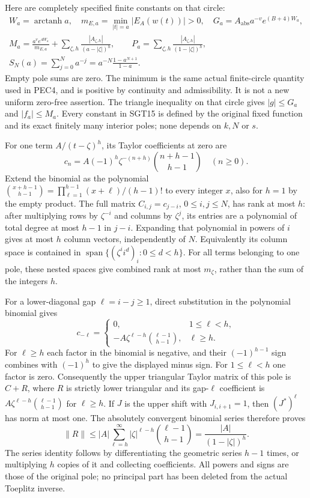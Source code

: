 \documentclass[11pt,a4paper]{article}
\begin{document}
Here are completely specified finite constants on that circle:
\[
\begin{gathered}
 W_a=\operatorname{arctanh}a,\quad
 m_{E,a}=\min_{|t|=a}|E_A(w(t))|>0,\quad
 G_a=A_{\mathrm{abs}}a^{-v}e^{(B+4)W_a},\\
 M_a=\frac{a^ve^{4W_a}}{m_{E,a}}
       +\sum_{\zeta,h}\frac{|A_{\zeta,h}|}{(a-|\zeta|)^h},
 \qquad
 P_a=\sum_{\zeta,h}\frac{|A_{\zeta,h}|}{(1-|\zeta|)^h},\\
 S_N(a)=\sum_{j=0}^Na^{-j}
       =a^{-N}\frac{1-a^{N+1}}{1-a}.
\end{gathered}\tag{SGT15}
\]
Empty pole sums are zero. The minimum is the same actual finite-circle
quantity used in PEC4, and is positive by continuity and admissibility.
It is not a new uniform zero-free assertion. The triangle inequality on
that circle gives $|g|\le G_a$ and $|f_a|\le M_a$.
Every constant in SGT15 is defined by the original fixed function and
its exact finitely many interior poles; none depends on $k,N$ or $s$.

For one term $A/(t-\zeta)^h$, its Taylor coefficients at zero are
\[
 c_n=A(-1)^h\zeta^{-(n+h)}
             \binom{n+h-1}{h-1}\quad(n\ge0).
 \tag{SGT16}
\]
Extend the binomial as the polynomial
$\binom{x+h-1}{h-1}=\prod_{\ell=1}^{h-1}(x+\ell)/(h-1)!$
to every integer $x$, also for $h=1$ by the empty product.
The full matrix $C_{i,j}=c_{j-i}$, $0\le i,j\le N$, has rank at most
$h$: after multiplying rows by $\zeta^{-i}$ and columns by $\zeta^j$,
its entries are a polynomial of total degree at most $h-1$ in $j-i$.
Expanding that polynomial in powers of $i$ gives at most $h$ column
vectors, independently of $N$. Equivalently its column space is
contained in $\operatorname{span}\{(\zeta^ii^d)_i:0\le d<h\}$.
For all terms belonging to one pole, these nested spaces give combined
rank at most $m_\zeta$, rather than the sum of the integers $h$.

For a lower-diagonal gap $\ell=i-j\ge1$, direct substitution in
the polynomial binomial gives
\[
 c_{-\ell}=
 \begin{cases}
 0,&1\le\ell<h,\\
 -A\zeta^{\ell-h}\binom{\ell-1}{h-1},&\ell\ge h .
 \end{cases}\tag{SGT17}
\]
For $\ell\ge h$ each factor in the binomial is negative, and their
$(-1)^{h-1}$ sign combines with $(-1)^h$ to give the displayed
minus sign. For $1\le\ell<h$ one factor is zero.
Consequently the upper triangular Taylor matrix of this pole is
$C+R$, where $R$ is strictly lower triangular and its gap-$\ell$
coefficient is $A\zeta^{\ell-h}\binom{\ell-1}{h-1}$ for $\ell\ge h$.
If $J$ is the upper shift with $J_{i,i+1}=1$, then
$(J^*)^\ell$ has norm at most one. The absolutely convergent binomial
series therefore proves
\[
 \|R\|\le |A|\sum_{\ell=h}^{\infty}
                 |\zeta|^{\ell-h}\binom{\ell-1}{h-1}
          =\frac{|A|}{(1-|\zeta|)^h}.
 \tag{SGT18}
\]
The series identity follows by differentiating the geometric series
$h-1$ times, or multiplying $h$ copies of it and collecting coefficients.
All powers and signs are those of the original pole; no principal
part has been deleted from the actual Toeplitz inverse.
\end{document}
